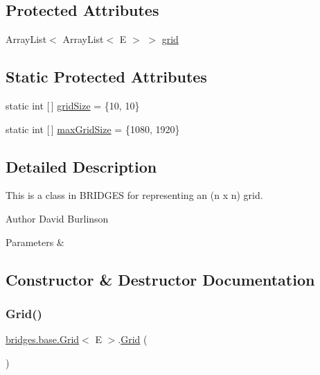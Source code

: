 \subsection*{Protected Attributes}
\begin{DoxyCompactItemize}
\item 
Array\+List$<$ Array\+List$<$ E $>$ $>$ \mbox{\hyperlink{classbridges_1_1base_1_1_grid_ad1f3f6968d58188425bd992c05c655a6}{grid}}
\end{DoxyCompactItemize}
\subsection*{Static Protected Attributes}
\begin{DoxyCompactItemize}
\item 
static int \mbox{[}$\,$\mbox{]} \mbox{\hyperlink{classbridges_1_1base_1_1_grid_a54a66479f78022570253d771206a0420}{grid\+Size}} = \{10, 10\}
\item 
static int \mbox{[}$\,$\mbox{]} \mbox{\hyperlink{classbridges_1_1base_1_1_grid_a803fd4c070a22863c82581f0bb258c1c}{max\+Grid\+Size}} = \{1080, 1920\}
\end{DoxyCompactItemize}


\subsection{Detailed Description}
This is a class in B\+R\+I\+D\+G\+ES for representing an (n x n) grid. 

\begin{DoxyAuthor}{Author}
David Burlinson 
\end{DoxyAuthor}

\begin{DoxyParams}{Parameters}
{\em } & \\
\hline
\end{DoxyParams}


\subsection{Constructor \& Destructor Documentation}
\mbox{\label{classbridges_1_1base_1_1_grid_aa621ffc958db8341f7ce37ed78944d51}} 
\subsubsection{\texorpdfstring{Grid()}{Grid()}\hspace{0.1cm}{\footnotesize\ttfamily [1/4]}}
{\footnotesize\ttfamily \mbox{\hyperlink{classbridges_1_1base_1_1_grid}{bridges.\+base.\+Grid}}$<$ E $>$.\mbox{\hyperlink{classbridges_1_1base_1_1_grid}{Grid}} (\begin{DoxyParamCaption}{ }\end{DoxyParamCaption})}


